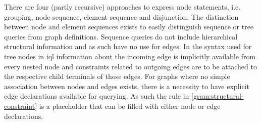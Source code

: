\documentclass[11pt,a4paper]{report}
\begin{document}
\noindent There are four (partly recursive) approaches to express node statements, i.e. grouping, node sequence, element sequence and disjunction. 
The distinction between node and element sequences exists to easily distinguish sequence or tree queries from graph definitions.
Sequence queries do not include hierarchical structural information and as such have no use for edges.
In the syntax used for tree nodes in \ac{iql} information about the incoming edge is implicitly available from every nested node and constraints related to outgoing edges are to be attached to the respective child terminals of those edges.
For graphs where no simple association between nodes and edges exists, there is a necessity to have explicit edge declarations available for querying.
As such the  rule in \cref{gram:structural-constraint} is a placeholder that can be filled with either node or edge declarations.
\end{document}
